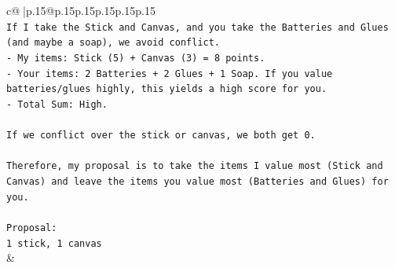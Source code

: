 \documentclass{article}
\begin{document}
{\begin{supertabular}{c@{$\;$}|p{.15\linewidth}@{}p{.15\linewidth}p{.15\linewidth}p{.15\linewidth}p{.15\linewidth}p{.15\linewidth}}
{{{\\ 
\texttt{If I take the Stick and Canvas, and you take the Batteries and Glues (and maybe a soap), we avoid conflict.} \\
\texttt{{-} My items: Stick (5) + Canvas (3) = 8 points.} \\
\texttt{{-} Your items: 2 Batteries + 2 Glues + 1 Soap. If you value batteries/glues highly, this yields a high score for you.} \\
\texttt{{-} Total Sum: High.} \\
\\ 
\texttt{If we conflict over the stick or canvas, we both get 0.} \\
\\ 
\texttt{Therefore, my proposal is to take the items I value most (Stick and Canvas) and leave the items you value most (Batteries and Glues) for you.} \\
\\ 
\texttt{Proposal:} \\
\texttt{1 stick, 1 canvas} \\
            }
        }
    }
    & \\ \\


\end{supertabular}}
\end{document}
